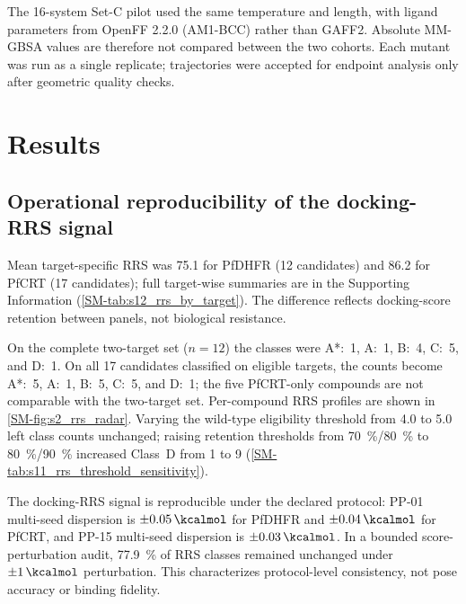 \documentclass[journal=jcisd8,manuscript=article,layout=traditional]{achemso}
\begin{document}
The 16-system Set-C pilot used the same temperature and length, with ligand parameters from OpenFF 2.2.0 (AM1-BCC) rather than GAFF2. Absolute MM-GBSA values are therefore not compared between the two cohorts. Each mutant was run as a single replicate; trajectories were accepted for endpoint analysis only after geometric quality checks.


\section{Results}

\subsection{Operational reproducibility of the docking-RRS signal}

Mean target-specific RRS was 75.1 for PfDHFR (12 candidates) and 86.2 for PfCRT (17 candidates); full target-wise summaries are in the Supporting Information (\cref{SM-tab:s12_rrs_by_target}). The difference reflects docking-score retention between panels, not biological resistance.

On the complete two-target set ($n=\num{12}$) the classes were A*:~\num{1}, A:~\num{1}, B:~\num{4}, C:~\num{5}, and D:~\num{1}. On all 17 candidates classified on eligible targets, the counts become A*:~\num{5}, A:~\num{1}, B:~\num{5}, C:~\num{5}, and D:~\num{1}; the five PfCRT-only compounds are not comparable with the two-target set. Per-compound RRS profiles are shown in \cref{SM-fig:s2_rrs_radar}. Varying the wild-type eligibility threshold from \qty{4.0}{\kcalmol} to \qty{5.0}{\kcalmol} left class counts unchanged; raising retention thresholds from \qty{70}{\percent}/\qty{80}{\percent} to \qty{80}{\percent}/\qty{90}{\percent} increased Class~D from 1 to 9 (\cref{SM-tab:s11_rrs_threshold_sensitivity}).

The docking-RRS signal is reproducible under the declared protocol: PP-01 multi-seed dispersion is $\pm\qty{0.05}{\kcalmol}$ for PfDHFR and $\pm\qty{0.04}{\kcalmol}$ for PfCRT, and PP-15 multi-seed dispersion is $\pm\qty{0.03}{\kcalmol}$. In a bounded score-perturbation audit, \qty{77.9}{\percent} of RRS classes remained unchanged under $\pm\qty{1}{\kcalmol}$ perturbation. This characterizes protocol-level consistency, not pose accuracy or binding fidelity.
\end{document}
